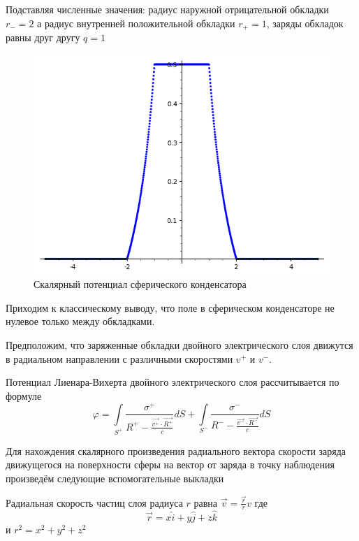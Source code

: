 ﻿\documentclass[12pt, letterpaper]{article}
\begin{document}
Подставляя численные значения: радиус наружной отрицательной обкладки ${{r}_{-}}=2$ а радиус внутренней положительной обкладки ${{r}_{+}}=1$, заряды обкладок равны друг другу $q=1$

\begin{figure}
    \centering
    \includegraphics[scale=0.3]{spherical_capascitor_phi_Rneg=2_Rpos=1}
    \caption{Скалярный потенциал сферического конденсатора}
    \label{fig:spherical_capascitor_phi_Rneg=2_Rpos=1}
\end{figure}

Приходим к классическому выводу, что поле в сферическом конденсаторе не нулевое только между обкладками.

Предположим, что заряженные обкладки двойного электрического слоя движутся в радиальном направлении с различными скоростями ${{v}^{+}}$ и ${{v}^{-}}$. 

Потенциал Лиенара-Вихерта двойного электрического слоя рассчитывается по формуле
	\[\varphi =\int\limits_{{{S}^{+}}}{\frac{{{\sigma }^{+}}}{{{R}^{+}}-\frac{\overrightarrow{{{v}^{+}}}\cdot \overrightarrow{{{R}^{+}}}}{c}}dS+}\int\limits_{{{S}^{-}}}{\frac{{{\sigma }^{-}}}{{{R}^{-}}-\frac{\overrightarrow{{{v}^{-}}}\cdot \overrightarrow{{{R}^{-}}}}{c}}dS}\] 	

Для нахождения скалярного произведения радиального вектора скорости заряда движущегося на поверхности сферы на вектор от заряда в точку наблюдения произведём следующие вспомогательные выкладки

Радиальная скорость частиц слоя радиуса $r$ равна $\overrightarrow{v}=\frac{\overrightarrow{r}}{r}v$ где \[\overrightarrow{r}=x\widehat{i}+y\widehat{j}+z\widehat{k}\] и ${{r}^{2}}={{x}^{2}}+{{y}^{2}}+{{z}^{2}}$ 
\end{document}
